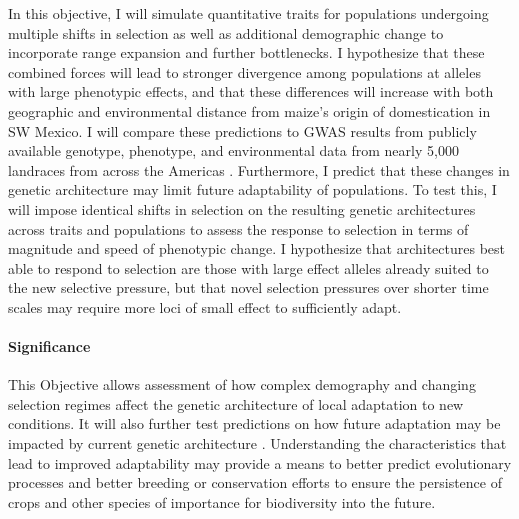 In this objective, I will simulate quantitative traits for populations undergoing multiple shifts in selection as well as additional demographic change to incorporate range expansion and further bottlenecks. I hypothesize that these combined forces will lead to stronger divergence among populations at alleles with large phenotypic effects, and that these differences will increase with both geographic and environmental distance from maize's origin of domestication in SW Mexico. I will compare these predictions to GWAS results from publicly available genotype, phenotype, and environmental data from nearly 5,000 landraces from across the Americas \citep{Hearne2015}. Furthermore, I predict that these changes in genetic architecture may limit future adaptability of populations. To test this, I will impose identical shifts in selection on the resulting genetic architectures across traits and populations to assess the response to selection in terms of magnitude and speed of phenotypic change. I hypothesize that architectures best able to respond to selection are those with large effect alleles already suited to the new selective pressure, but that novel selection pressures over shorter time scales may require more loci of small effect to sufficiently adapt.

\vspace{-2ex}
\paragraph{Significance}
This Objective allows assessment of how complex demography and changing selection regimes affect the genetic architecture of local adaptation to new conditions. It will also further test predictions on how future adaptation may be impacted by current genetic architecture \citep{Yeaman:2015cc}. Understanding the characteristics that lead to improved adaptability  may provide a means to better predict evolutionary processes and better breeding or conservation efforts to ensure the persistence of crops and other species of importance for biodiversity into the future.
\vspace{-3ex}


